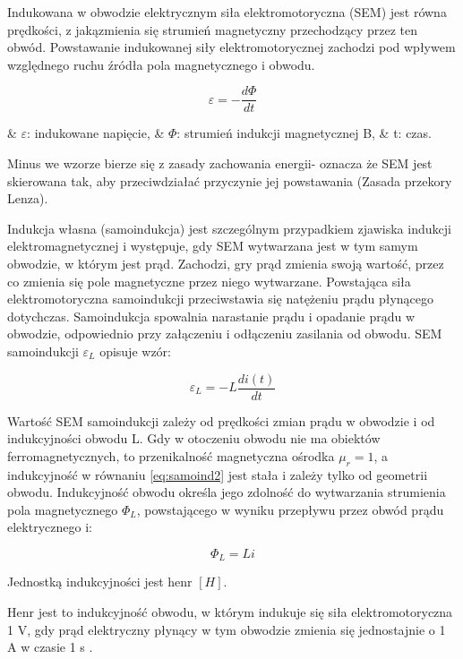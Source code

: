 Indukowana w obwodzie elektrycznym siła elektromotoryczna (SEM) jest równa prędkości, z jakązmienia się strumień magnetyczny przechodzący przez ten obwód. Powstawanie indukowanej siły elektromotorycznej zachodzi pod wpływem względnego ruchu źródła pola magnetycznego i obwodu.

\begin{equation} \label{eq:samoind1}
	\varepsilon = - \frac{d \Phi}{d t}
\end{equation}

\begin{easylist}
	& $ \varepsilon $: indukowane napięcie,
	& $ \Phi $: strumień indukcji magnetycznej B,
	& t: czas.
	\\
\end{easylist} 
	
Minus we wzorze bierze się z zasady zachowania energii- oznacza że SEM jest skierowana tak, aby przeciwdziałać przyczynie jej powstawania (Zasada przekory Lenza).

Indukcja własna (samoindukcja) jest szczególnym przypadkiem zjawiska indukcji elektromagnetycznej i występuje, gdy SEM wytwarzana jest w tym samym obwodzie, w którym jest prąd. Zachodzi, gry prąd zmienia swoją wartość, przez co zmienia się pole magnetyczne przez niego wytwarzane. Powstająca siła elektromotoryczna samoindukcji przeciwstawia się natężeniu prądu płynącego dotychczas. Samoindukcja spowalnia narastanie prądu i opadanie prądu w obwodzie, odpowiednio przy załączeniu i odłączeniu zasilania od obwodu. SEM samoindukcji $ \varepsilon_L $ opisuje wzór:

\begin{equation} \label{eq:samoind2}
	\varepsilon_L = - L \frac{d i(t)}{d t}
\end{equation}

Wartość SEM samoindukcji zależy od prędkości zmian prądu w obwodzie i od indukcyjności obwodu L. Gdy w otoczeniu obwodu nie ma obiektów ferromagnetycznych, to przenikalność magnetyczna ośrodka $ \mu_r = 1 $, a indukcyjność w równaniu \ref{eq:samoind2} jest stała i zależy tylko od geometrii obwodu. Indukcyjność obwodu określa jego zdolność do wytwarzania strumienia pola magnetycznego $ \Phi_L $, powstającego w wyniku przepływu przez obwód prądu elektrycznego i:

\begin{equation} \label{eq:samoind3}
	\Phi_L = L i
\end{equation}

Jednostką indukcyjności jest henr $ [H] $.
\begin{defn}
	Henr jest to indukcyjność obwodu, w którym indukuje się siła elektromotoryczna 1 V, gdy prąd elektryczny płynący w tym obwodzie zmienia się jednostajnie o 1 A w czasie 1 s \cite{kaluszko}.
\end{defn}  

